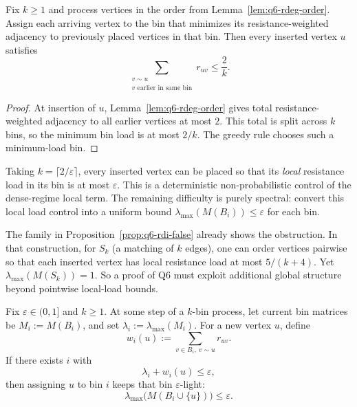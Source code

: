 \begin{corollary}\label{cor:q6-rdeg-order-bin}
Fix $k\ge 1$ and process vertices in the order from
Lemma~\ref{lem:q6-rdeg-order}.
Assign each arriving vertex to the bin that minimizes its
resistance-weighted adjacency to previously placed vertices in that bin.
Then every inserted vertex $u$ satisfies
\[
\sum_{\substack{v\sim u\\ v\text{ earlier in same bin}}} r_{uv}\le \frac{2}{k}.
\]
\end{corollary}

\begin{proof}
At insertion of $u$, Lemma~\ref{lem:q6-rdeg-order} gives total
resistance-weighted adjacency to all earlier vertices at most $2$.
This total is split across $k$ bins, so the minimum bin load is at most
$2/k$.
The greedy rule chooses such a minimum-load bin.
\end{proof}

\begin{remark}
Taking $k=\lceil 2/\varepsilon\rceil$, every inserted vertex can be
placed so that its \emph{local} resistance load in its bin is at most
$\varepsilon$.
This is a deterministic non-probabilistic control of the dense-regime
local term. The remaining difficulty is purely spectral:
convert this local load control into a uniform bound
$\lambda_{\max}(M(B_i))\le \varepsilon$ for each bin.
\end{remark}

\begin{remark}
The family in Proposition~\ref{prop:q6-rdi-false} already shows the
obstruction. In that construction, for $S_k$ (a matching of $k$ edges),
one can order vertices pairwise so that each inserted vertex has local
resistance load at most $5/(k+4)$.
Yet $\lambda_{\max}(M(S_k))=1$.
So a proof of Q6 must exploit additional global structure beyond
pointwise local-load bounds.
\end{remark}

\begin{proposition}\label{prop:q6-onestep}
Fix $\varepsilon\in(0,1]$ and $k\ge 1$.
At some step of a $k$-bin process, let current bin matrices be
$M_i:=M(B_i)$, and set $\lambda_i:=\lambda_{\max}(M_i)$.
For a new vertex $u$, define
\[
w_i(u):=\sum_{v\in B_i,\ v\sim u} r_{uv}.
\]
If there exists $i$ with
\[
\lambda_i+w_i(u)\le \varepsilon,
\]
then assigning $u$ to bin $i$ keeps that bin $\varepsilon$-light:
\[
\lambda_{\max}\!\big(M(B_i\cup\{u\})\big)\le \varepsilon.
\]
\end{proposition}

